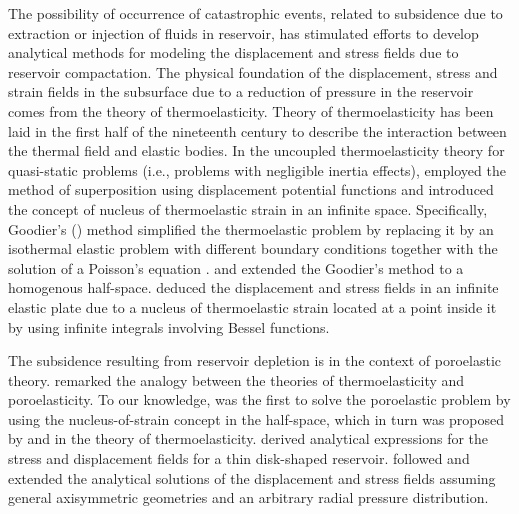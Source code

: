 \documentclass[journal abbreviation, manuscript]{copernicus}
\begin{document}
The possibility of occurrence of catastrophic events, related to subsidence due to extraction or injection of fluids in reservoir, has stimulated efforts to  develop analytical methods for modeling the displacement and stress fields due to reservoir compactation.
The physical foundation of the displacement, stress and strain fields in the subsurface due to a reduction of pressure in the reservoir comes from the theory of thermoelasticity.
Theory of thermoelasticity has been laid in the first half of the nineteenth century to describe the interaction between the thermal field and elastic bodies.
In the uncoupled thermoelasticity theory for quasi-static problems (i.e., problems with negligible inertia effects), \cite{Goodier37} employed the method of superposition using
displacement potential functions and introduced the  concept of nucleus of thermoelastic strain in an infinite space.
Specifically, Goodier’s (\citeyear{Goodier37}) method simplified the thermoelastic problem by replacing it by an isothermal elastic problem with different boundary conditions together with the solution of a Poisson’s equation \citep{Tao71}. 
\cite{Mindlin&Cheng50} and \cite{Sen51} extended the Goodier's method to a homogenous half-space.
\cite{Sharma56} deduced the displacement and stress fields in an infinite elastic plate due to a nucleus of thermoelastic strain located at a point inside it by using infinite integrals involving Bessel functions.

The subsidence resulting from reservoir depletion is in the context of poroelastic theory. 
\cite{Geertsma57} remarked the analogy between the theories of thermoelasticity and poroelasticity.
To our knowledge, \cite{Geertsma73} was the first to solve the poroelastic problem by using the nucleus-of-strain concept in the half-space, which in turn was proposed by \cite{Mindlin&Cheng50} and \cite{Sen51} in the theory of thermoelasticity.
\cite{Geertsma73} derived analytical expressions for the stress and displacement fields for a thin disk-shaped reservoir. 
\cite{Segall92} followed \cite{Geertsma73} and extended the analytical solutions of the displacement and stress fields assuming general axisymmetric geometries and an arbitrary radial pressure distribution. 
\end{document}
